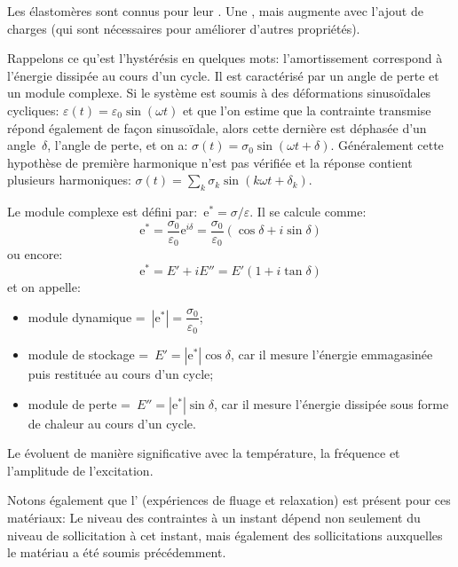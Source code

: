 \medskip
Les élastomères sont connus pour leur . Une , mais augmente avec l'ajout de charges (qui sont nécessaires pour améliorer d'autres propriétés).

Rappelons ce qu'est l'hystérésis en quelques mots: l'amortissement correspond à l'énergie dissipée au cours d'un cycle. Il est caractérisé par un angle de perte et un module complexe. Si le système est soumis à des déformations sinusoïdales cycliques: 
$\varepsilon(t)=\varepsilon_0\sin(\omega t)$ 
et que l'on estime que la contrainte transmise répond également de façon sinusoïdale, alors cette dernière est déphasée d'un angle~$\delta$, l'angle de perte, et on a: 
$\sigma(t)=\sigma_0\sin(\omega t+\delta)$.
Généralement cette hypothèse de première harmonique n'est pas vérifiée et la réponse contient plusieurs harmoniques:
$\sigma(t) = \sum_k \sigma_k\sin(k\omega t+\delta_k)$.

Le module complexe est défini par:~$\mathrm{e}^* = \sigma / \varepsilon$. Il se calcule comme:
\begin{equation} \mathrm{e}^*=\dfrac{\sigma_0}{\varepsilon_0}\mathrm{e}^{i\delta}=\dfrac{\sigma_0}{\varepsilon_0}(\cos\delta+i\sin\delta)\end{equation}
ou encore:
\begin{equation}
\mathrm{e}^* = E' + i E'' = E'(1+i\tan\delta)
\end{equation}
et on appelle:
\begin{itemize}
	\item module dynamique =~$|\mathrm{e}^*|=\dfrac{\sigma_0}{\varepsilon_0}$;
	\item module de stockage =~$E'=|\mathrm{e}^*|\cos\delta$, car il mesure l'énergie
		emmagasinée puis restituée au cours d'un cycle;
	\item module de perte =~$E''=|\mathrm{e}^*|\sin\delta$, car il mesure l'énergie
		dissipée sous forme de chaleur au cours d'un cycle.
\end{itemize}
Le  évoluent de manière significative avec la température, la fréquence et l'amplitude
de l'excitation.

\medskip
Notons également que l' (expériences de fluage et relaxation) est présent pour ces matériaux: Le niveau des contraintes à un instant dépend non seulement du niveau de sollicitation à cet instant, mais également des sollicitations auxquelles le matériau a été soumis précédemment.


